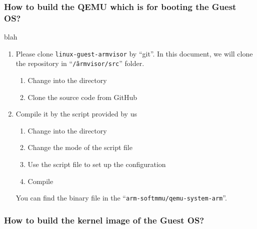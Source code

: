 \documentclass[12pt]{article}  %
\begin{document}
\subsubsection{How to build the QEMU which is for booting the Guest OS?}
blah

\begin{enumerate}
\item Please clone \texttt{linux-guest-armvisor} by ``git''. In this document, we will clone the repository in ``\texttt{\~/armvisor/src}'' folder.

\begin{enumerate}
\item Change into the directory\newline
{}

\item Clone the source code from GitHub\newline
{}

\end{enumerate}

\item Compile it by the script provided by us

\begin{enumerate}
\item Change into the directory\newline
{}

\item Change the mode of the script file\newline
{}

\item Use the script file to set up the configuration\newline
{}

\item Compile\newline
{}

\end{enumerate}

You can find the binary file in the ``\texttt{arm-softmmu/qemu-system-arm}''.

\end{enumerate}

\subsubsection{How to build the kernel image of the Guest OS?}
\end{document}
